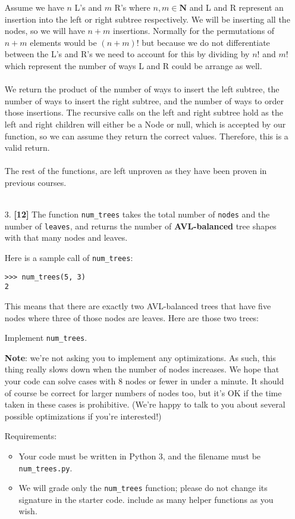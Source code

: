 \documentclass{assignment-263}
\begin{document}
\begin{enumerate}
Assume we have $n$ L's and $m$ R's where $n,m \in \mathbf{N}$ and L and R represent an insertion into the left or right subtree respectively. We will be inserting all the nodes, so we will have $n + m$ insertions. Normally for the permutations of $n + m$ elements would be $(n + m)!$ but because we do not differentiate between the L's and R's we need to account for this by dividing by $n!$ and $m!$ which represent the number of ways L and R could be arrange as well.\\\\
We return the product of the number of ways to insert the left subtree, the number of ways to insert the right subtree, and the number of ways to order those insertions. The recursive calls on the left and right subtree hold as the left and right children will either be a Node or null, which is accepted by our function, so we can assume they return the correct values. Therefore, this is a valid return.\\\\
The rest of the functions, are left unproven as they have been proven in previous courses.\\\\

\item[3.] \textbf{[12]} 
The function \verb|num_trees| takes the total number of \verb|nodes| and the number of \verb|leaves|, and returns the number of {\bf AVL-balanced} tree shapes with that many nodes and leaves.

Here is a sample call of \verb|num_trees|:
\begin{verbatim}
>>> num_trees(5, 3)
2
\end{verbatim}

This means that there are exactly two AVL-balanced trees that have five nodes where three of those nodes are leaves. Here are those two trees:


Implement \verb|num_trees|.

{\bf Note}: we're not asking you to implement any optimizations. As such, this thing really slows down when the number of nodes increases. We hope that your code can solve cases with 8 nodes or fewer in under a minute. It should of course be correct for larger numbers of nodes too, but it's OK if the time taken in these cases is prohibitive. (We're happy to talk to you about several possible optimizations if you're interested!)

Requirements:
\begin{itemize}
\item Your code must be written in Python 3, and the filename must be \verb|num_trees.py|.
\item We will grade only the \verb|num_trees| function; please do not change its signature in the starter code. include as many helper functions as you wish.
   \end{itemize}


\end{enumerate}
\end{document}
